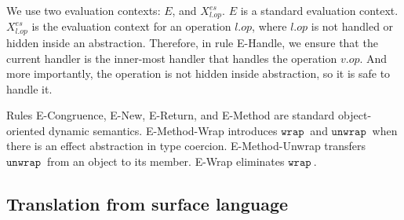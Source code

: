 \documentclass{article}
\newcommand{\keywadj}[1]{\mathtt{#1}}
\newcommand{\keyw}[1]{\keywadj{#1}~}
\begin{document}
We use two evaluation contexts: $E$, and $X^{es}_{l.op}$. $E$ is a standard evaluation context. $X^{es}_{l.op}$ is the evaluation context for an operation $l.op$, where $l.op$ is not handled or hidden inside an abstraction. Therefore, in rule E-Handle, we ensure that the current handler is the inner-most handler that handles the operation $v.op$. And more importantly, the operation is not hidden inside abstraction, so it is safe to handle it.

Rules E-Congruence, E-New, E-Return, and E-Method are standard object-oriented dynamic semantics. E-Method-Wrap introduces $\keyw{wrap}$ and $\keyw{unwrap}$  when there is an effect abstraction in type coercion. E-Method-Unwrap transfers $\keyw{unwrap}$ from an object to its member.  E-Wrap eliminates $\keyw{wrap}$.


\subsection{ Translation from surface language}
\label{sec-translation}
\end{document}
